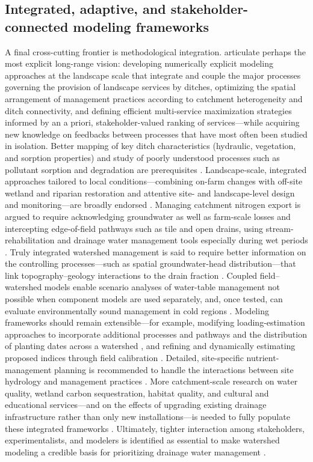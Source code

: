 \documentclass[11pt]{article}
\begin{document}
\subsection{Integrated, adaptive, and stakeholder-connected modeling frameworks}

A final cross-cutting frontier is methodological integration. \textcite{Dollinger2015} articulate perhaps the most explicit long-range vision: developing numerically explicit modeling approaches at the landscape scale that integrate and couple the major processes governing the provision of landscape services by ditches, optimizing the spatial arrangement of management practices according to catchment heterogeneity and ditch connectivity, and defining efficient multi-service maximization strategies informed by an a priori, stakeholder-valued ranking of services---while acquiring new knowledge on feedbacks between processes that have most often been studied in isolation. Better mapping of key ditch characteristics (hydraulic, vegetation, and sorption properties) and study of poorly understood processes such as pollutant sorption and degradation are prerequisites \parencite{Dollinger2015,Herzon2008}. Landscape-scale, integrated approaches tailored to local conditions---combining on-farm changes with off-site wetland and riparian restoration and attentive site- and landscape-level design and monitoring---are broadly endorsed \parencite{Blann2009}. Managing catchment nitrogen export is argued to require acknowledging groundwater as well as farm-scale losses and intercepting edge-of-field pathways such as tile and open drains, using stream-rehabilitation and drainage water management tools especially during wet periods \parencite{Goeller2019}. Truly integrated watershed management is said to require better information on the controlling processes---such as spatial groundwater-head distribution---that link topography--geology interactions to the drain fraction \parencite{Mahmood2023}. Coupled field--watershed models enable scenario analyses of water-table management not possible when component models are used separately, and, once tested, can evaluate environmentally sound management in cold regions \parencite{Dayyani2010}. Modeling frameworks should remain extensible---for example, modifying loading-estimation approaches to incorporate additional processes and pathways and the distribution of planting dates across a watershed \parencite{Basu2010}, and refining and dynamically estimating proposed indices through field calibration \parencite{Tao2025}. Detailed, site-specific nutrient-management planning is recommended to handle the interactions between site hydrology and management practices \parencite{Kurz2005}. More catchment-scale research on water quality, wetland carbon sequestration, habitat quality, and cultural and educational services---and on the effects of upgrading existing drainage infrastructure rather than only new installations---is needed to fully populate these integrated frameworks \parencite{Mitchell2022}. Ultimately, tighter interaction among stakeholders, experimentalists, and modelers is identified as essential to make watershed modeling a credible basis for prioritizing drainage water management \parencite{Wang2020b,Kröger2013}.

\printbibliography
\end{document}
